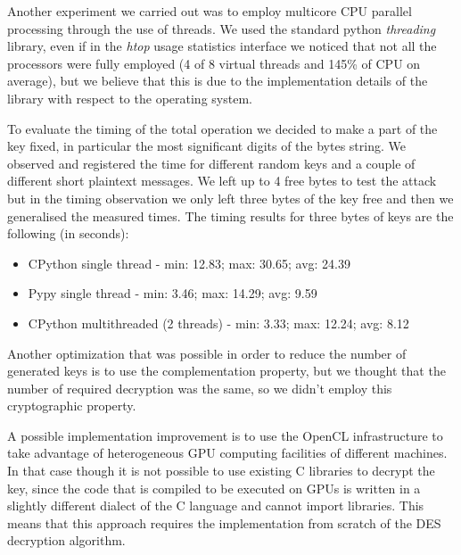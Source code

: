 \documentclass[11pt]{article}
\begin{document}
Another experiment we carried out was to employ multicore CPU parallel processing through the use of threads. We used the standard python \textit{threading} library, even if in the \textit{htop} usage statistics interface we noticed that not all the processors were fully employed (4 of 8 virtual threads and 145\% of CPU on average), but we believe that this is due to the implementation details of the library with respect to the operating system.

To evaluate the timing of the total operation we decided to make a part of the key fixed, in particular the most significant digits of the bytes string. We observed and registered the time for different random keys and a couple of different short plaintext messages. We left up to 4 free bytes to test the attack but in the timing observation we only left three bytes of the key free and then we generalised the measured times. The timing results for three bytes of keys are the following (in seconds):
\begin{itemize}
\item CPython single thread - min: 12.83; max: 30.65; avg: 24.39
\item Pypy single thread - min: 3.46; max: 14.29; avg: 9.59
\item CPython multithreaded (2 threads) - min: 3.33; max: 12.24; avg: 8.12
\end{itemize}

Another optimization that was possible in order to reduce the number of generated keys is to use the complementation property, but we thought that the number of required decryption was the same, so we didn't employ this cryptographic property.

A possible implementation improvement is to use the OpenCL infrastructure to take advantage of heterogeneous GPU computing facilities of different machines. In that case though it is not possible to use existing C libraries to decrypt the key, since the code that is compiled to be executed on GPUs is written in a slightly different dialect of the C language and cannot import libraries. This means that this approach requires the implementation from scratch of the DES decryption algorithm.
\end{document}
